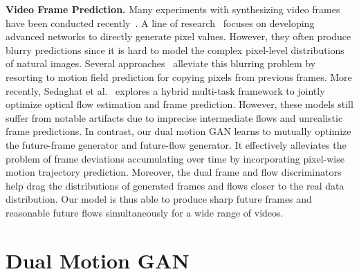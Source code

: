 \documentclass[10pt,twocolumn,letterpaper]{article}
\begin{document}
	\textbf{Video Frame Prediction.} Many experiments with synthesizing video frames have been conducted recently~\cite{mathieu2015deep,lotter2016deep,liu2017video, sedaghat2016next,xue2016visual,patraucean2015spatio}. A line of research~\cite{mathieu2015deep,lotter2016deep, xue2016visual,vondrick2016generating} focuses on developing advanced networks to directly generate pixel values. However, they often produce blurry predictions since it is hard to model the complex pixel-level distributions of natural images. %
	Several approaches~\cite{patraucean2015spatio,liu2017video, sedaghat2016next} alleviate this blurring problem by resorting to motion field prediction for copying pixels from previous frames. %
 More recently, Sedaghat et al.~\cite{sedaghat2016next} explores a hybrid multi-task framework to jointly optimize optical flow estimation and frame prediction. However, these models still suffer from notable artifacts due to imprecise intermediate flows and unrealistic frame predictions. In contrast, our dual motion GAN learns to mutually optimize the future-frame generator and future-flow generator. It effectively alleviates the problem of frame deviations accumulating over time by incorporating pixel-wise motion trajectory prediction. Moreover, the dual frame and flow discriminators help drag the distributions of generated frames and flows closer to the real data distribution. Our model is thus able to produce sharp future frames and reasonable future flows simultaneously for a wide range of videos.
	
	\section{Dual Motion GAN}
	\label{sec:model}
	
\end{document}
